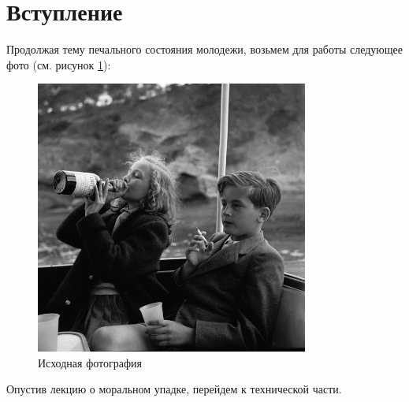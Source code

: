\section{Вступление}

Продолжая тему печального состояния молодежи, возьмем для работы следующее фото (см. рисунок \ref{img:source}):
\begin{figure}[ht!]
    \centering
    \includegraphics[width=0.8\textwidth]{../image.png}
    \caption{Исходная фотография}
    \label{img:source}
\end{figure}

Опустив лекцию о моральном упадке, перейдем к технической части. 


